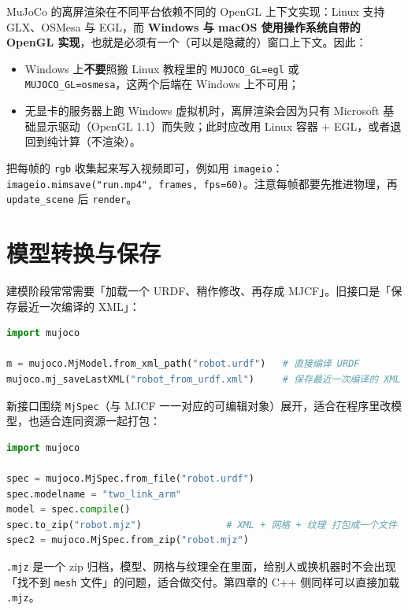 MuJoCo 的离屏渲染在不同平台依赖不同的 OpenGL 上下文实现：Linux 支持 GLX、OSMesa 与 EGL，而 \textbf{Windows 与 macOS 使用操作系统自带的 OpenGL 实现}，也就是必须有一个（可以是隐藏的）窗口上下文。因此：

\begin{itemize}
	\item Windows 上\textbf{不要}照搬 Linux 教程里的 \texttt{MUJOCO\_GL=egl} 或 \texttt{MUJOCO\_GL=osmesa}，这两个后端在 Windows 上不可用；
	\item 无显卡的服务器上跑 Windows 虚拟机时，离屏渲染会因为只有 Microsoft 基础显示驱动（OpenGL 1.1）而失败；此时应改用 Linux 容器 + EGL，或者退回到纯计算（不渲染）。
\end{itemize}

\begin{tipbox}[录像]
	把每帧的 \texttt{rgb} 收集起来写入视频即可，例如用 \texttt{imageio}：
	\texttt{imageio.mimsave("run.mp4", frames, fps=60)}。注意每帧都要先推进物理，再 \texttt{update\_scene} 后 \texttt{render}。
\end{tipbox}

\section{模型转换与保存}

建模阶段常常需要「加载一个 URDF、稍作修改、再存成 MJCF」。旧接口是「保存最近一次编译的 XML」：

\begin{lstlisting}[style=code, language=Python]
import mujoco

m = mujoco.MjModel.from_xml_path("robot.urdf")   # 直接编译 URDF
mujoco.mj_saveLastXML("robot_from_urdf.xml")     # 保存最近一次编译的 XML
\end{lstlisting}

新接口围绕 \texttt{MjSpec}（与 MJCF 一一对应的可编辑对象）展开，适合在程序里改模型，也适合连同资源一起打包：

\begin{lstlisting}[style=code, language=Python]
import mujoco

spec = mujoco.MjSpec.from_file("robot.urdf")
spec.modelname = "two_link_arm"
model = spec.compile()
spec.to_zip("robot.mjz")               # XML + 网格 + 纹理 打包成一个文件
spec2 = mujoco.MjSpec.from_zip("robot.mjz")
\end{lstlisting}

\texttt{.mjz} 是一个 zip 归档，模型、网格与纹理全在里面，给别人或换机器时不会出现「找不到 \texttt{mesh} 文件」的问题，适合做交付。第四章的 C++ 侧同样可以直接加载 \texttt{.mjz}。

